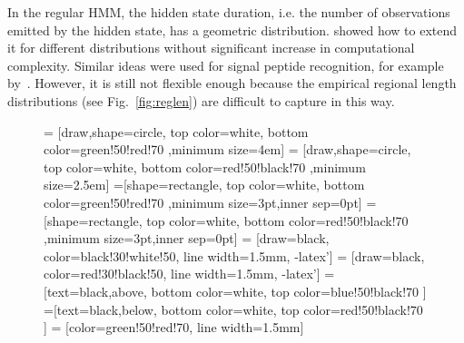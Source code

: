 \documentclass[fleqn,10pt,twoside]{gcb15submission}
\begin{document}
In the regular HMM, the hidden state duration, i.e. the number of observations emitted by the hidden state, has a geometric distribution. \citep{Durbin98biologicalsequence} showed how to extend it for different distributions without significant increase in computational 
complexity. Similar ideas were used for signal peptide recognition, for example by~\citep{2004klla}. 
However, it is still not flexible enough because the empirical regional length distributions (see Fig.~\ref{fig:reglen})
are difficult to capture in this way.

\begin{figure}[h]
\centering
{} = [draw,shape=circle, top color=white, bottom color=green!50!red!70 ,minimum size=4em]
 = [draw,shape=circle, top color=white, bottom color=red!50!black!70 ,minimum size=2.5em]
\def\radius{.7mm} 
=[shape=rectangle, top color=white, bottom color=green!50!red!70 ,minimum size=3pt,inner sep=0pt]
=[shape=rectangle, top color=white, bottom color=red!50!black!70 ,minimum size=3pt,inner sep=0pt]
\def\n{11}
  = [draw=black, color=black!30!white!50, line width=1.5mm, -latex'] 
  = [draw=black, color=red!30!black!50, line width=1.5mm, -latex']
=[text=black,above, bottom color=white, top color=blue!50!black!70  ]
=[text=black,below, bottom color=white, top color=red!50!black!70  ]
  = [color=green!50!red!70, line width=1.5mm]
\def\names{{"$O_{1,1}$","...","$O_{1,d_1}$", "...","$O_{k, 1}$", "...", "$O_{k, d_k}$"}}%
\end{figure}
\end{document}
